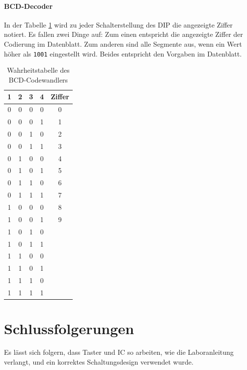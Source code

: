\documentclass[
    paper=a4,
]{scrartcl}
\begin{document}
    \paragraph{BCD-Decoder} In der Tabelle \ref{tab:3} wird zu jeder Schalterstellung des DIP die angezeigte Ziffer notiert. Es fallen zwei Dinge auf: Zum einen entspricht die angezeigte Ziffer der Codierung im Datenblatt. Zum anderen sind alle Segmente aus, wenn ein Wert höher als \texttt{1001} eingestellt wird. Beides entspricht den Vorgaben im Datenblatt.
    
    \begin{table}[h]
        \centering
        \caption{Wahrheitstabelle des BCD-Codewandlers}
        \label{tab:3}
        \begin{tabular}{cccc|c}\toprule
            1   &   2   &   3   &   4   &   Ziffer\\\midrule
            0   &   0   &   0   &   0   &   0\\
            0   &   0   &   0   &   1   &   1\\
            0   &   0   &   1   &   0   &   2\\
            0   &   0   &   1   &   1   &   3\\
            0   &   1   &   0   &   0   &   4\\
            0   &   1   &   0   &   1   &   5\\
            0   &   1   &   1   &   0   &   6\\
            0   &   1   &   1   &   1   &   7\\
            1   &   0   &   0   &   0   &   8\\
            1   &   0   &   0   &   1   &   9\\\midrule
            1   &   0   &   1   &   0   &   \\
            1   &   0   &   1   &   1   &   \\
            1   &   1   &   0   &   0   &   \\
            1   &   1   &   0   &   1   &   \\
            1   &   1   &   1   &   0   &   \\
            1   &   1   &   1   &   1   &   \\\bottomrule
        \end{tabular}
    \end{table}

\section{Schlussfolgerungen}
    Es lässt sich folgern, dass Taster und IC so arbeiten, wie die Laboranleitung verlangt, und ein korrektes Schaltungsdesign verwendet wurde.   
\end{document}
